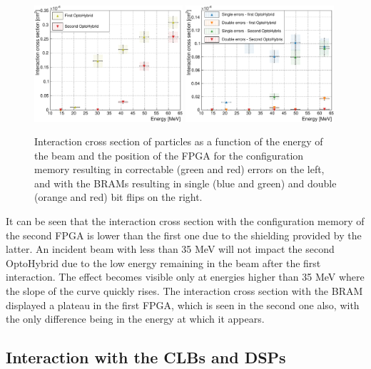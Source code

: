       \begin{figure}[h!]
        \centering
        \includegraphics[width=0.49\textwidth]{img/plots/cE_SEU_Comp-crop}
        \includegraphics[width=0.49\textwidth]{img/plots/cE_BRAM_Comp-crop}
        \caption{Interaction cross section of particles as a function of the energy of the beam and the position of the FPGA for the configuration memory resulting in correctable (green and red) errors on the left, and with the BRAMs resulting in single (blue and green) and double (orange and red) bit flips on the right.}
        \label{fig:II-6-data-seu-comp}
      \end{figure}

      It can be seen that the interaction cross section with the configuration memory of the second FPGA is lower than the first one due to the shielding provided by the latter. An incident beam with less than 35 MeV will not impact the second OptoHybrid due to the low energy remaining in the beam after the first interaction. The effect becomes visible only at energies higher than 35 MeV where the slope of the curve quickly rises. The interaction cross section with the BRAM displayed a plateau in the first FPGA, which is seen in the second one also, with the only difference being in the energy at which it appears.

    \subsection{Interaction with the CLBs and DSPs}

